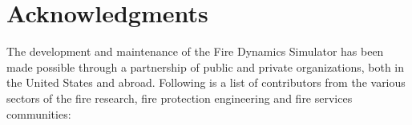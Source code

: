 \documentclass[11pt]{book}
\begin{document}



\chapter{Acknowledgments}

\label{acksection}

The development and maintenance of the Fire Dynamics Simulator has been made possible through
a partnership of public and private organizations, both in the United States and abroad. Following
is a list of contributors from the various sectors of the fire research, fire protection engineering and
fire services communities:
\end{document}
